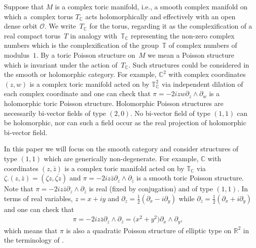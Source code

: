 \documentclass[10pt,a4paper]{amsart}
\numberwithin{equation}{section}
\begin{document}
Suppose that $M$ is a complex toric manifold, i.e., a smooth complex manifold on which a~complex torus $T_{\mathbb C}$ acts holomorphically and ef\/fectively with an open dense orbit $\mathcal O$. We write~$T_{\mathbb C}$ for the torus, regarding it as the complexif\/ication of a real compact torus~$T$ in analogy with~${\mathbb T}_{\mathbb C}$ representing the non-zero complex numbers which is the complexif\/ication of the group~${\mathbb T}$ of complex numbers of modulus~$1$. By a toric Poisson structure on~$M$ we mean a Poisson structure which is invariant under the action of~$T_{\mathbb C}$. Such structures could be considered in the smooth or holomorphic category. For example, ${\mathbb C}^2$ with complex coordinates $(z,w)$ is a complex toric manifold acted on by ${\mathbb T}_{\mathbb C}^2$ via independent dilation of each complex coordinate and one can check that $\pi=-2izw\partial_z\wedge \partial_w$ is a holomorphic toric Poisson structure. Holomorphic Poisson structures are necessarily bi-vector f\/ields of type $(2,0)$. No bi-vector f\/ield of type $(1,1)$ can be holomorphic, nor can such a f\/ield occur as the real projection of holomorphic bi-vector f\/ield.

In this paper we will focus on the smooth category and consider structures of type $(1,1)$ which are generically non-degenerate. For example, ${\mathbb C}$ with coordinates $(z,\bar{z})$ is a complex toric manifold acted on by ${\mathbb T}_{\mathbb C}$ via $\zeta.(z,\bar{z})=(\zeta z,\overline{\zeta z})$ and $\pi=-2i z\bar{z}\partial_z\wedge \partial_{\bar{z}}$ is a smooth toric Poisson structure. Note that $\pi=-2i z\bar{z}\partial_z\wedge \partial_{\bar{z}}$ is real (f\/ixed by conjugation) and of type $(1,1)$. In terms of real variables, $z=x+iy$ and $\partial_z=\frac{1}{2}(\partial_x-i\partial_y)$ while $\partial_{\bar{z}}=\frac{1}{2}(\partial_x+i\partial_y)$ and one can check that
\begin{gather}\label{basic_example}
\pi=-2i z\bar{z}\partial_z\wedge \partial_{\bar{z}}=\big(x^2+y^2\big)\partial_x\wedge\partial_y,
\end{gather}
which means that $\pi$ is also a quadratic Poisson structure of elliptic type on ${\mathbb R}^2$ in the terminology of \cite{LiuXu}.
\end{document}

